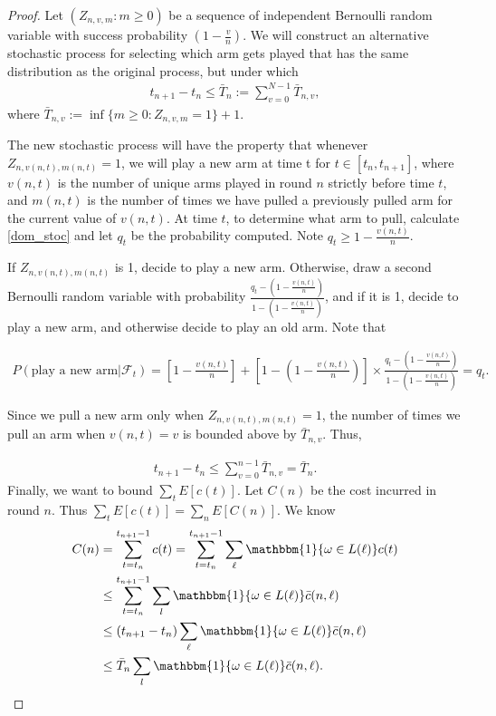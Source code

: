 \documentclass[twoside,11pt]{article}
\begin{document}
\begin{proof}
Let $(Z_{n,v,m}:m\geq 0)$ be a sequence of independent Bernoulli random variable with success probability $(1-\frac{v}{n})$. We will construct an alternative stochastic process for selecting which arm gets played that has the same distribution as the original process, but under which
\begin{align}
t_{n+1}-t_{n}\leq \bar{T}_{n}:=\sum_{v=0}^{N-1}\bar{T}_{n,v}, \nonumber 
\end{align}
where $\bar{T}_{n,v}:=\inf\{m\geq 0: Z_{n,v,m}=1\}+1$.

The new stochastic process will have the property that whenever $Z_{n,v(n,t),m(n,t)}=1$, we will play a new arm at time t for $t\in [t_{n}, t_{n+1}]$, where $v(n,t)$ is the number of unique arms played in round $n$ strictly before time $t$, and $m(n,t)$ is the number of times we have pulled a previously pulled arm for the current value of $v(n,t)$. At time $t$, to determine what arm to pull, calculate \eqref{dom_stoc} and let $q_t$ be the probability computed. Note $q_t\geq 1-\frac{v(n,t)}{n}$.

If $Z_{n,v(n,t),m(n,t)}$ is 1, decide to play a new arm. Otherwise, draw a second Bernoulli random variable with probability $\frac{q_t-(1-\frac{v(n,t)}{n})}{1-(1-\frac{v(n,t)}{n})}$, and if it is 1, decide to play a new arm, and otherwise decide to play an old arm. Note that

\begin{align}
P(\text{play a new arm}|\mathcal{F}_{t})=\left[1-\frac{v(n,t)}{n}\right]+\left[1-(1-\frac{v(n,t)}{n})\right]\times \frac{q_t-(1-\frac{v(n,t)}{n})}{1-(1-\frac{v(n,t)}{n})}=q_t.
\end{align}

Since we pull a new arm only when $Z_{n,v(n,t),m(n,t)}=1$, the number of times we pull an arm when $v(n,t)=v$ is bounded above by $\bar{T}_{n,v}$. Thus,

\begin{align}
t_{n+1}-t_{n}\leq \sum_{v=0}^{n-1}\bar{T}_{n,v}=\bar{T}_{n}.
\end{align}
Finally, we want to bound $\sum_{t}E[c(t)]$. Let $C(n)$ be the cost incurred in round $n$. Thus $\sum_{t}E[c(t)]=\sum_{n}E[C(n)]$. We know
\begin{align}
C(n)&=\sum_{t=t_n}^{t_{n+1}-1}c(t)=\sum_{t=t_{n}}^{t_{n+1}-1}\sum_{\ell}\mathbbm{1}\{\omega\in L(\ell)\}c(t) \nonumber \\
&\leq \sum_{t=t_{n}}^{t_{n+1}-1}\sum_{l}\mathbbm{1}\{\omega\in L(\ell)\}\bar{c}(n,\ell) \nonumber \\
&\leq (t_{n+1}-t_{n})\sum_{\ell} \mathbbm{1}\{\omega\in L(\ell)\}\bar{c}(n,\ell) \nonumber \\
&\leq \bar{T}_{n}\sum_{l}\mathbbm{1}\{\omega\in L(\ell)\}\bar{c}(n,\ell). \nonumber
\end{align}


\end{proof}
\end{document}
